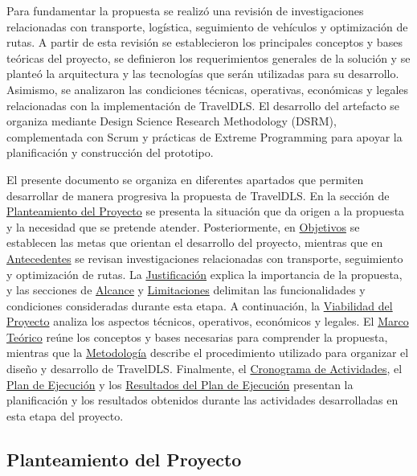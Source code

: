Para fundamentar la propuesta se realizó una revisión de investigaciones relacionadas con transporte, logística, seguimiento de vehículos y optimización de rutas. A partir de esta revisión se establecieron los principales conceptos y bases teóricas del proyecto, se definieron los requerimientos generales de la solución y se planteó la arquitectura y las tecnologías que serán utilizadas para su desarrollo. Asimismo, se analizaron las condiciones técnicas, operativas, económicas y legales relacionadas con la implementación de TravelDLS. El desarrollo del artefacto se organiza mediante Design Science Research Methodology (DSRM), complementada con Scrum y prácticas de Extreme Programming para apoyar la planificación y construcción del prototipo.

El presente documento se organiza en diferentes apartados que permiten desarrollar de manera progresiva la propuesta de TravelDLS. En la sección de \hyperref[sec:planteamiento]{Planteamiento del Proyecto} se presenta la situación que da origen a la propuesta y la necesidad que se pretende atender. Posteriormente, en \hyperref[sec:objetivos]{Objetivos} se establecen las metas que orientan el desarrollo del proyecto, mientras que en \hyperref[sec:antecedentes]{Antecedentes} se revisan investigaciones relacionadas con transporte, seguimiento y optimización de rutas. La \hyperref[sec:justificacion]{Justificación} explica la importancia de la propuesta, y las secciones de \hyperref[sec:alcance]{Alcance} y \hyperref[sec:limitaciones]{Limitaciones} delimitan las funcionalidades y condiciones consideradas durante esta etapa. A continuación, la \hyperref[sec:viabilidad]{Viabilidad del Proyecto} analiza los aspectos técnicos, operativos, económicos y legales. El \hyperref[sec:marco-teorico]{Marco Teórico} reúne los conceptos y bases necesarias para comprender la propuesta, mientras que la \hyperref[sec:metodologia]{Metodología} describe el procedimiento utilizado para organizar el diseño y desarrollo de TravelDLS. Finalmente, el \hyperref[sec:cronograma]{Cronograma de Actividades}, el \hyperref[sec:plan-ejecucion]{Plan de Ejecución} y los \hyperref[sec:resultados-plan]{Resultados del Plan de Ejecución} presentan la planificación y los resultados obtenidos durante las actividades desarrolladas en esta etapa del proyecto.

\subsection{Planteamiento del Proyecto}
\label{sec:planteamiento}

